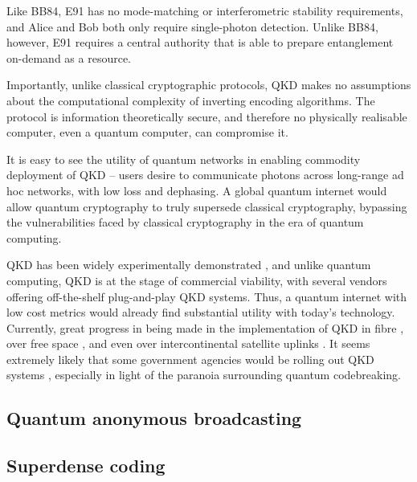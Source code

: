 \documentclass[aps,rmp,twocolumn,amsmath,amssymb,nofootinbib,superscriptaddress,longbibliography,floatfix]{revtex4-1}
\newcommand{\comment}[1]{{\color{blue}{\textbf{#1}}}}
\begin{document}
Like BB84, E91 has no mode-matching or interferometric stability requirements, and Alice and Bob both only require single-photon detection. Unlike BB84, however, E91 requires a central authority that is able to prepare entanglement on-demand as a resource.

Importantly, unlike classical cryptographic protocols, QKD makes no assumptions about the computational complexity of inverting encoding algorithms. The protocol is information theoretically secure, and therefore no physically realisable computer, even a quantum computer, can compromise it.

It is easy to see the utility of quantum networks in enabling commodity deployment of QKD -- users desire to communicate photons across long-range ad hoc networks, with low loss and dephasing. A global quantum internet would allow quantum cryptography to truly supersede classical cryptography, bypassing the vulnerabilities faced by classical cryptography in the era of quantum computing.

QKD has been widely experimentally demonstrated \cite{???}, and unlike quantum computing, QKD is at the stage of commercial viability, with several vendors offering off-the-shelf plug-and-play QKD systems. Thus, a quantum internet with low cost metrics would already find substantial utility with today's technology. Currently, great progress in being made in the implementation of QKD in fibre \cite{???}, over free space \cite{bib:Buttler00}, and even over intercontinental satellite uplinks \cite{JWP}. It seems extremely likely that some government agencies would be rolling out QKD systems \cite{bib:Secret}, especially in light of the paranoia surrounding quantum codebreaking.

%
%

\subsection{Quantum anonymous broadcasting} \label{sec:anon_broad}

\cite{Wehner}

\comment{Ryan TO DO}

%
%

\subsection{Superdense coding}

\cite{???}

\comment{Ryan to do}
\end{document}

